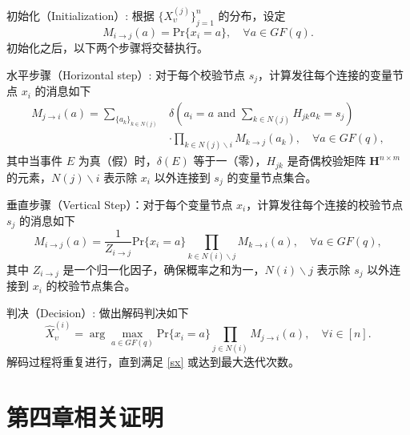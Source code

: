 初始化（Initialization）: 根据 $\{X_\upsilon^{(j)}\}_{j=1}^n$ 的分布，设定
\begin{equation}
	M_{i \to j}(a) = \text{Pr}\{x_i = a\}, \quad \forall a \in GF(q).
	\label{eq:bp_init}
\end{equation}
初始化之后，以下两个步骤将交替执行。

水平步骤（Horizontal step）: 对于每个校验节点 $s_j$，计算发往每个连接的变量节点 $x_i$ 的消息如下
\begin{align}
	M_{j \to i}(a) = \sum_{\{a_k\}_{k \in N(j)}} &\delta(a_i = a \text{ and } \sum_{k \in N(j)} H_{jk} a_k = s_j) \nonumber \\
	&\cdot \prod_{k \in N(j) \backslash i} M_{k \to j}(a_k), \quad \forall a \in GF(q),
	\label{eq:bp_horizontal}
\end{align}
其中当事件 $E$ 为真（假）时，$\delta(E)$ 等于一（零），$H_{jk}$ 是奇偶校验矩阵 $\mathbf{H}^{n \times m}$ 的元素，$N(j) \backslash i$ 表示除 $x_i$ 以外连接到 $s_j$ 的变量节点集合。

垂直步骤（Vertical Step）：对于每个变量节点 $x_i$，计算发往每个连接的校验节点 $s_j$ 的消息如下
\begin{equation}
	M_{i \to j}(a) = \frac{1}{Z_{i \to j}} \text{Pr}\{x_i = a\} \prod_{k \in N(i) \backslash j} M_{k \to i}(a), \quad \forall a \in GF(q),
	\label{eq:bp_vertical}
\end{equation}
其中 $Z_{i \to j}$ 是一个归一化因子，确保概率之和为一，$N(i) \backslash j$ 表示除 $s_j$ 以外连接到 $x_i$ 的校验节点集合。

判决（Decision）: 做出解码判决如下
\begin{equation}
	\hat{X}_\upsilon^{(i)} = \arg \max_{a \in GF(q)} \text{Pr}\{x_i = a\} \prod_{j \in N(i)} M_{j \to i}(a), \quad \forall i \in [n].
	\label{eq:bp_decision}
\end{equation}
解码过程将重复进行，直到满足 \eqref{sx} 或达到最大迭代次数。


\chapter{第四章相关证明}


